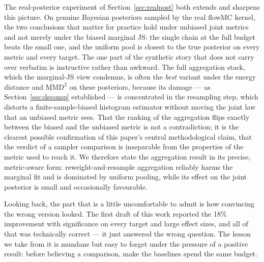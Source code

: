 \documentclass[11pt]{article}
\begin{document}
The real-posterior experiment of Section~\ref{sec:realpost} both extends and
sharpens this picture. On genuine Bayesian posteriors sampled by the real flowMC
kernel, the two conclusions that matter for practice hold under unbiased joint
metrics and not merely under the biased marginal JS: the single chain at the
full budget beats the small one, and the uniform pool is closest to the true
posterior on every metric and every target. The one part of the synthetic story
that does not carry over verbatim is instructive rather than awkward. The full
aggregation stack, which the marginal-JS view condemns, is often the
\emph{best} variant under the energy distance and $\mathrm{MMD}^2$ on these
posteriors, because its damage --- as Section~\ref{sec:decomp} established --- is
concentrated in the resampling step, which distorts a finite-sample-biased
histogram estimator without moving the joint law that an unbiased metric sees.
That the ranking of the aggregation flips exactly between the biased and the
unbiased metric is not a contradiction; it is the clearest possible
confirmation of this paper's central methodological claim, that the verdict of a
sampler comparison is inseparable from the properties of the metric used to
reach it. We therefore state the aggregation result in its precise, metric-aware
form: reweight-and-resample aggregation reliably harms the marginal fit and is
dominated by uniform pooling, while its effect on the joint posterior is small
and occasionally favourable.

Looking back, the part that is a little uncomfortable to admit is how
convincing the wrong version looked. The first draft of this work reported the
18\% improvement with significance on every target and large effect sizes, and
all of that was technically correct --- it just answered the wrong question.
The lesson we take from it is mundane but easy to forget under the pressure of
a positive result: before believing a comparison, make the baselines spend the
same budget.
\end{document}
